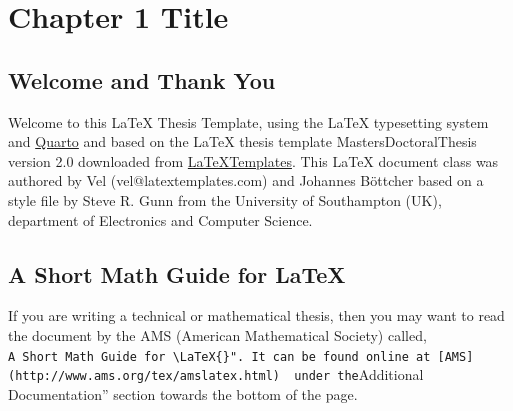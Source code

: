 \documentclass[
  letterpaper,
  11pt,
  english,
  singlespacing,
  headsepline]{MastersDoctoralThesis}
\begin{document}




\dedicatory{} 



\mainmatter %

\pagestyle{thesis} %
\newcommand{\keyword}[1]{\textbf{#1}}
\newcommand{\tabhead}[1]{\textbf{#1}}
\newcommand{\code}[1]{\texttt{#1}}
\newcommand{\file}[1]{\texttt{\bfseries#1}}
\newcommand{\option}[1]{\texttt{\itshape#1}}



\chapter{Chapter 1 Title}\label{sec-Chapter1}

\section{Welcome and Thank You}\label{welcome-and-thank-you}

Welcome to this \LaTeX{} Thesis Template, using the \LaTeX{} typesetting
system and \href{quarto.org}{Quarto} and based on the \LaTeX{} thesis
template MastersDoctoralThesis version 2.0 downloaded from
\href{http://www.LaTeXTemplates.com}{LaTeXTemplates}. This LaTeX
document class was authored by Vel (vel@latextemplates.com) and Johannes
Böttcher based on a style file by Steve R. Gunn from the University of
Southampton (UK), department of Electronics and Computer Science.

\section{\texorpdfstring{A Short Math Guide for
\LaTeX{}}{A Short Math Guide for }}\label{a-short-math-guide-for}

If you are writing a technical or mathematical thesis, then you may want
to read the document by the AMS (American Mathematical Society) called,
\texttt{A\ Short\ Math\ Guide\ for\ \textbackslash{}LaTeX\{\}".\ It\ can\ be\ found\ online\ at\ {[}AMS{]}(http://www.ams.org/tex/amslatex.html)\ \ under\ the}Additional
Documentation'' section towards the bottom of the page.
\end{document}
